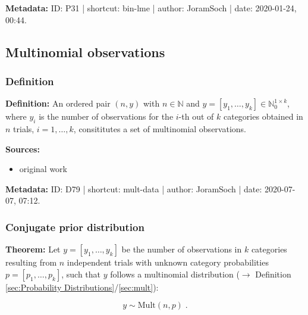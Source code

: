\documentclass[a4paper,12pt,twoside]{book}
\begin{document}
\vspace{1em}
\textbf{Metadata:} ID: P31 | shortcut: bin-lme | author: JoramSoch | date: 2020-01-24, 00:44.
\vspace{1em}



\subsection{Multinomial observations}

\subsubsection[\textit{Definition}]{Definition} \label{sec:mult-data}
\setcounter{equation}{0}

\textbf{Definition:} An ordered pair $(n,y)$ with $n \in \mathbb{N}$ and $y = \left[ y_1, \ldots, y_k \right] \in \mathbb{N}_0^{1 \times k}$, where $y_i$ is the number of observations for the $i$-th out of $k$ categories obtained in $n$ trials, $i = 1, \ldots, k$, consititutes a set of multinomial observations.


\vspace{1em}
\textbf{Sources:}
\begin{itemize}
\item original work\end{itemize}


\vspace{1em}
\textbf{Metadata:} ID: D79 | shortcut: mult-data | author: JoramSoch | date: 2020-07-07, 07:12.
\vspace{1em}



\subsubsection[\textbf{Conjugate prior distribution}]{Conjugate prior distribution} \label{sec:mult-prior}
\setcounter{equation}{0}

\textbf{Theorem:} Let $y = [y_1, \ldots, y_k]$ be the number of observations in $k$ categories resulting from $n$ independent trials with unknown category probabilities $p = [p_1, \ldots, p_k]$, such that $y$ follows a multinomial distribution ($\rightarrow$ Definition \ref{sec:Probability Distributions}/\ref{sec:mult}):

\begin{equation} \label{eq:mult-prior-Mult}
y \sim \mathrm{Mult}(n,p) \; .
\end{equation}
\end{document}
